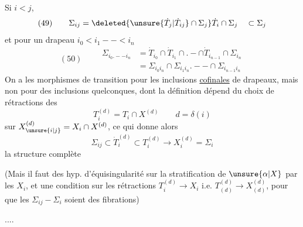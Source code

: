 Si $i<j$, 
\[
(49)\qquad\Sigma_{ij}=\deleted{\unsure{\dot T_j|\dot T_{ij}}\cap\Sigma_j}
\dot T_i\cap\Sigma_j\quad\subset\Sigma_j
\]
et pour un drapeau $i_0<i_1--<i_n$
\[
(50)\qquad\begin{aligned}
\Sigma_{i_0.--i_n}&=\dot T_{i_0}\cap\dot T_{i_1}\cap .-\cap
\dot T_{i_{n-1}}\cap\Sigma_{i_n}\\
&=\Sigma_{i_0i_n}\cap\Sigma_{i_1i_n}.--\cap\Sigma_{i_{n-1}i_n}
\end{aligned}
\]
On a  les morphismes de transition
 pour les
 inclusions \uline{cofinales} de drapeaux,
mais non pour des inclusions quelconques, dont la définition dépend
du choix de rétractions des
\[
T_i^{(d)}=T_i\cap X^{(d)}\qquad d=\delta(i)
\]
sur $X_{\unsure{i|j}}^{(d)}=X_i\cap X^{(d)}$, ce qui donne alors
\[
\Sigma_{ij}\subset\dot T_i^{(d)}\subset T_i^{(d)}
\longrightarrow X_i^{(d)}=\Sigma_i
\]
la structure complète

(Mais il faut des hyp. d'équisingularité sur la
 stratification de $\unsure{\alpha|X}$ par les $X_i$,
et une condition 
sur les rétractions
$T_i^{(d)}\longrightarrow X_i$ i.e. 
$T_{(d)}^{(d)}\longrightarrow X_{(d)}^{(d)}$,
pour que les $\Sigma_{ij}\mathrel{-}\Sigma_i$ soient des fibrations)

....
